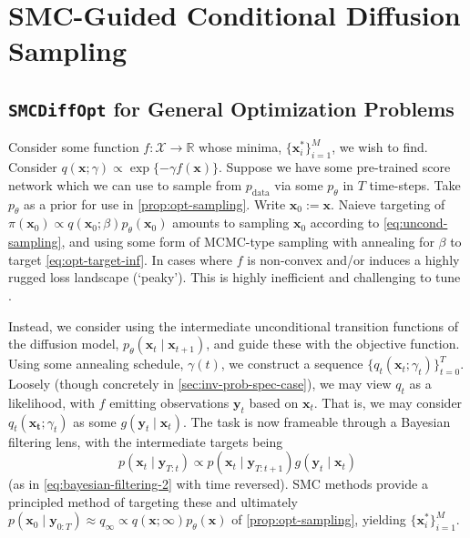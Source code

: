 \chapter{SMC-Guided Conditional Diffusion Sampling} \label{chap:methods}

\section{\texttt{SMCDiffOpt} for General Optimization Problems} \label{sec:gen-opt}

Consider some function $f: \mathcal{X} \to \mathbb{R}$ whose minima, $\{\mathbf{x}^*_i\}_{i=1}^M$,
we wish to find. Consider $q(\mathbf{x}; \gamma) \propto \exp\{-\gamma f(\mathbf{x})\}$. Suppose we
have some pre-trained score network which we can use to sample from $p_{\text{data}}$ via some
$p_\theta$ in $T$ time-steps. Take $p_\theta$ as a prior for use in  \ref{prop:opt-sampling}. Write
$\mathbf{x}_0 := \mathbf{x}$. Naieve targeting of
$\pi(\mathbf{x}_0) \propto q(\mathbf{x}_0; \beta)p_\theta(\mathbf{x}_0)$ amounts to sampling
$\mathbf{x}_0$ according to \ref{eq:uncond-sampling}, and using some form of MCMC-type sampling with
annealing for $\beta$ to target \ref{eq:opt-target-inf}. In cases where $f$ is non-convex and/or
induces a highly rugged loss landscape (`peaky'). This is highly inefficient and challenging
to tune \parencite{kongDiffusionModelsConstrained2024}.

Instead, we consider using the intermediate unconditional transition functions of the diffusion
model, $p_\theta(\mathbf{x}_{t} \mid \mathbf{x}_{t+1})$, and guide these with the objective
function. Using some annealing schedule, $\gamma(t)$, we construct a sequence
$\{q_t(\mathbf{x}_t; \gamma_t)\}_{t=0}^T$. Loosely (though concretely in
\ref{sec:inv-prob-spec-case}), we may view $q_t$ as a likelihood, with $f$ emitting observations
$\mathbf{y}_t$ based on $\mathbf{x}_t$. That is, we may consider $q_t(\mathbf{x_t}; \gamma_t)$
as some $g(\mathbf{y}_t \mid \mathbf{x}_t)$. The task is now frameable through a Bayesian filtering
lens, with the intermediate targets being
\begin{equation}
    p(\mathbf{x}_t \mid \mathbf{y}_{T:t}) \propto p(\mathbf{x}_t \mid \mathbf{y}_{T:t+1})g(\mathbf{y}_t \mid \mathbf{x}_t)
\end{equation}
(as in \ref{eq:bayesian-filtering-2} with time reversed). SMC methods provide a principled
method of targeting these and ultimately
$p(\mathbf{x}_0 \mid \mathbf{y}_{0:T}) \approx q_\infty \propto q(\mathbf{x}; \infty)p_\theta(\mathbf{x})$
of \ref{prop:opt-sampling}, yielding $\{\mathbf{x}^*_i\}_{i=1}^M$.

